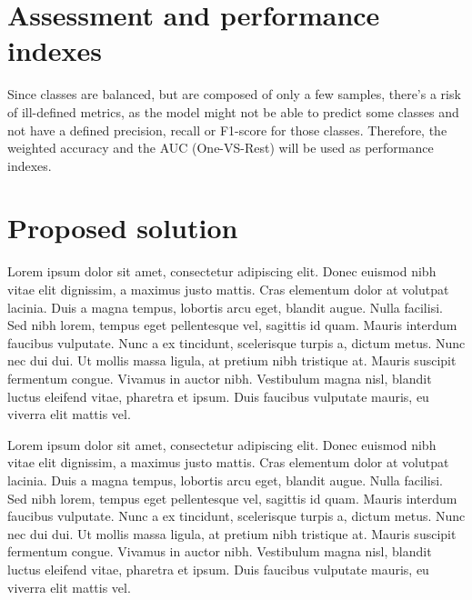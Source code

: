 \documentclass{article}
\begin{document}
\section{Assessment and performance indexes}

Since classes are balanced, but are composed of only a few samples, there's a risk of ill-defined metrics, as the model might not be able to predict some classes and not have a defined precision, recall or F1-score for those classes.
Therefore, the weighted accuracy and the AUC (One-VS-Rest) will be used as performance indexes.





\section{Proposed solution}
Lorem ipsum dolor sit amet, consectetur adipiscing elit.
Donec euismod nibh vitae elit dignissim, a maximus justo mattis.
Cras elementum dolor at volutpat lacinia.
Duis a magna tempus, lobortis arcu eget, blandit augue.
Nulla facilisi.
Sed nibh lorem, tempus eget pellentesque vel, sagittis id quam.
Mauris interdum faucibus vulputate.
Nunc a ex tincidunt, scelerisque turpis a, dictum metus.
Nunc nec dui dui.
Ut mollis massa ligula, at pretium nibh tristique at.
Mauris suscipit fermentum congue.
Vivamus in auctor nibh.
Vestibulum magna nisl, blandit luctus eleifend vitae, pharetra et ipsum.
Duis faucibus vulputate mauris, eu viverra elit mattis vel.

Lorem ipsum dolor sit amet, consectetur adipiscing elit.
Donec euismod nibh vitae elit dignissim, a maximus justo mattis.
Cras elementum dolor at volutpat lacinia.
Duis a magna tempus, lobortis arcu eget, blandit augue.
Nulla facilisi.
Sed nibh lorem, tempus eget pellentesque vel, sagittis id quam.
Mauris interdum faucibus vulputate.
Nunc a ex tincidunt, scelerisque turpis a, dictum metus.
Nunc nec dui dui.
Ut mollis massa ligula, at pretium nibh tristique at.
Mauris suscipit fermentum congue.
Vivamus in auctor nibh.
Vestibulum magna nisl, blandit luctus eleifend vitae, pharetra et ipsum.
Duis faucibus vulputate mauris, eu viverra elit mattis vel.
\end{document}
